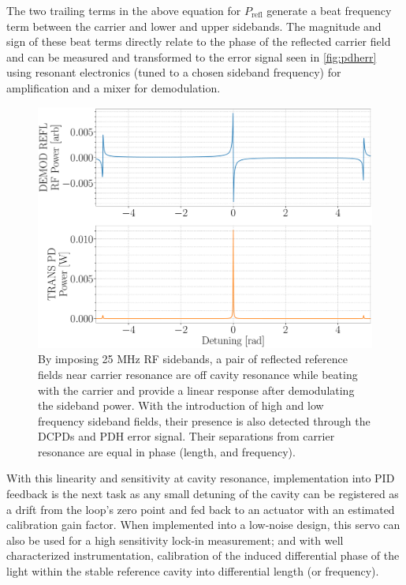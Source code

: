 The two trailing terms in the above equation for $P_\mathrm{refl}$ generate a beat frequency term between the carrier and lower and upper sidebands. The magnitude and sign of these beat terms directly relate to the phase of the reflected carrier field and can be measured and transformed to the error signal seen in \autoref{fig:pdherr} using resonant electronics (tuned to a chosen sideband frequency) for amplification and a mixer for demodulation.

\begin{figure}[H]
	\includegraphics[width=\textwidth]{figs/ALGAAS/pdh_error.pdf}
	\caption{By imposing 25 MHz RF sidebands, a pair of reflected reference fields near carrier resonance are off cavity resonance while beating with the carrier and provide a linear response after demodulating the sideband power. With the introduction of high and low frequency sideband fields, their presence is also detected through the DCPDs and PDH error signal. Their separations from carrier resonance are equal in phase (length, and frequency).}
\label{fig:pdherr}
\end{figure}

With this linearity and sensitivity at cavity resonance, implementation into PID feedback is the next task as any small detuning of the cavity can be registered as a drift from the loop's zero point and fed back to an actuator with an estimated calibration gain factor. When implemented into a low-noise design, this servo can also be used for a high sensitivity lock-in measurement; and with well characterized instrumentation, calibration of the induced differential phase of the light within the stable reference cavity into differential length (or frequency).


